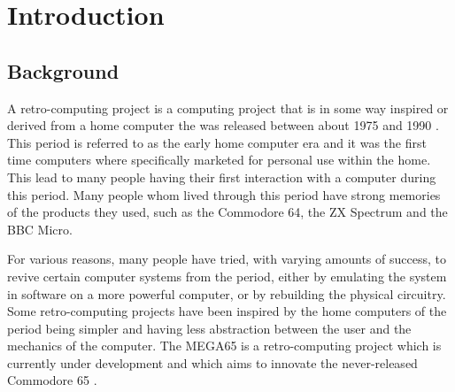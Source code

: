 \chapter{Introduction} %
\label{Chapter1} %

\section{Background}
A retro-computing project is a computing project that is in some way inspired or derived from a home computer the was released between about 1975 and 1990 \cite{magerkurth2004augmenting,suominen2015return}. This period is referred to as the early home computer era and it was the first time computers where specifically marketed for personal use within the home. This lead to many people having their first interaction with a computer during this period. Many people whom lived through this period have strong memories of the products they used, such as the Commodore 64, the ZX Spectrum and the BBC Micro. 

For various reasons, many people have tried, with varying amounts of success, to revive certain computer systems from the period, either by emulating the system in software on a more powerful computer, or by rebuilding the physical circuitry. Some retro-computing projects have been inspired by the home computers of the period being simpler and having less abstraction between the user and the mechanics of the computer. The MEGA65 is a retro-computing project which is currently under development and which aims to innovate the never-released Commodore 65 \cite{mega65}. 


